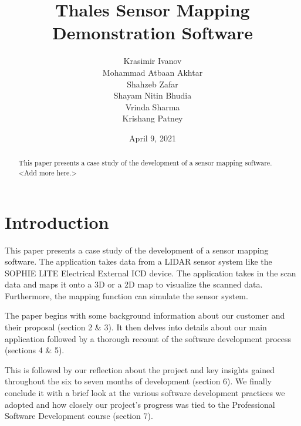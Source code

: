 \documentclass{l3proj}
\begin{document}
\title{Thales Sensor Mapping Demonstration Software}

    \author{Krasimir Ivanov\\
        Mohammad Atbaan Akhtar \\
        Shahzeb Zafar \\
        Shayam Nitin Bhudia \\
        Vrinda Sharma\\ 
        Krishang Patney\\}

\date{April 9, 2021}

\maketitle

\begin{abstract}

This paper presents a case study of the development of a sensor mapping software.   
<Add more here.>

\end{abstract}

\educationalconsent

\newpage

\section{Introduction}

This paper presents a case study of the development of a sensor mapping software. The application takes data from a LIDAR sensor system like the SOPHIE LITE Electrical External ICD device. The application takes in the scan data and maps it onto a 3D or a 2D map to visualize the scanned data. Furthermore, the mapping function can simulate the sensor system.

The paper begins with some background information about our customer and their proposal (section 2 \& 3). It then delves into details about our main application followed by a thorough recount of the software development process (sections 4 \& 5). 

This is followed by our reflection about the project and key insights gained throughout the six to seven months of development (section 6). We finally conclude it with a brief look at the various software development practices we adopted and how closely our project’s progress was tied to the Professional Software Development course (section 7).
\end{document}
